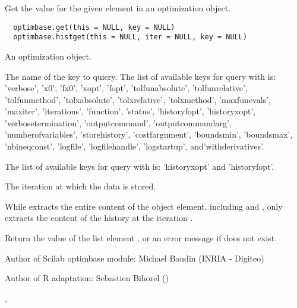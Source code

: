 %
\begin{Description}\relax
Get the value for the given element in an optimization object. 
\end{Description}
%
\begin{Usage}
\begin{verbatim}
  optimbase.get(this = NULL, key = NULL)
  optimbase.histget(this = NULL, iter = NULL, key = NULL)
\end{verbatim}
\end{Usage}
%
\begin{Arguments}
\begin{ldescription}
\item[\code{this}] An optimization object.
\item[\code{key}] The name of the key to quiery. The list of available keys for
query with  is: 'verbose', 'x0', 'fx0', 'xopt', 'fopt',
'tolfunabsolute', 'tolfunrelative', 'tolfunmethod', 'tolxabsolute',
'tolxrelative', 'tolxmethod', 'maxfunevals', 'maxiter', 'iterations',
'function', 'status', 'historyfopt', 'historyxopt', 'verbosetermination',
'outputcommand', 'outputcommandarg', 'numberofvariables', 'storehistory',
'costfargument', 'boundsmin', 'boundsmax', 'nbineqconst', 'logfile',
'logfilehandle', 'logstartup', and'withderivatives'.

The list of available keys for query with  is:
'historyxopt' and 'historyfopt'.

\item[\code{iter}] The iteration at which the data is stored.
\end{ldescription}
\end{Arguments}
%
\begin{Details}\relax
While  extracts the entire content of the object element,
including  and , 
only extracts the content of the history at the iteration .
\end{Details}
%
\begin{Value}
Return the value of the list element , or an error message if
 does not exist.
\end{Value}
%
\begin{Author}\relax
Author of Scilab optimbase module: Michael Baudin (INRIA - Digiteo)

Author of R adaptation: Sebastien Bihorel ()
\end{Author}
%
\begin{SeeAlso}\relax
{},
\end{SeeAlso}
